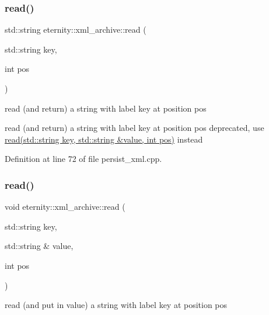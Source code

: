 \mbox{\label{classeternity_1_1xml__archive_a2e0b9a16f4b02b391967718f18175fc2}} 
\subsubsection{\texorpdfstring{read()}{read()}\hspace{0.1cm}{\footnotesize\ttfamily [1/6]}}
{\footnotesize\ttfamily std\+::string eternity\+::xml\+\_\+archive\+::read (\begin{DoxyParamCaption}\item[{std\+::string}]{key,  }\item[{int}]{pos }\end{DoxyParamCaption})}



read (and return) a string with label key at position pos 

read (and return) a string with label key at position pos deprecated, use \hyperlink{classeternity_1_1xml__archive_ac8267a952c5c9a6caa8b434f80d1b9d2}{read(std\+::string key, std\+::string \&value, int pos)} instead 

Definition at line 72 of file persist\+\_\+xml.\+cpp.

\mbox{\label{classeternity_1_1xml__archive_ac8267a952c5c9a6caa8b434f80d1b9d2}} 
\subsubsection{\texorpdfstring{read()}{read()}\hspace{0.1cm}{\footnotesize\ttfamily [2/6]}}
{\footnotesize\ttfamily void eternity\+::xml\+\_\+archive\+::read (\begin{DoxyParamCaption}\item[{std\+::string}]{key,  }\item[{std\+::string \&}]{value,  }\item[{int}]{pos }\end{DoxyParamCaption})}



read (and put in value) a string with label key at position pos 



